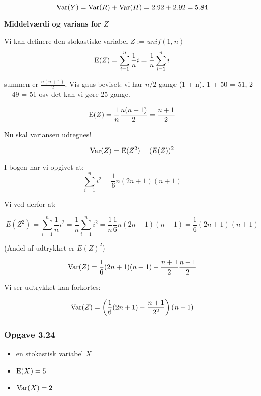 \begin{equation}
    \text{Var}(Y) = \text{Var}(R) + \text{Var}(H) = 2.92 + 2.92 = 5.84
\end{equation}

\textbf{Middelværdi og varians for $Z$}

Vi kan definere den stokastiske variabel $Z := unif(1,n)$
\begin{equation}
    \text{E}(Z) = \sum_{i=1}^n \frac{1}{n}i = \frac{1}{n}\sum_{i=1}^n i
\end{equation}

summen er $\frac{n(n+1)}{2}$. Vis gaus beviset: vi har $n/2$ gange (1 + n). 1 + 50 = 51, 2 + 49 = 51 osv det kan vi gøre 25 gange.

\begin{equation}
    \text{E}(Z) = \frac{1}{n} \frac{n(n+1)}{2} = \frac{n+1}{2}
\end{equation}

Nu skal variansen udregnes!

\begin{equation}
    \text{Var}(Z) = \text{E}(Z^2) - (E(Z))^2
\end{equation}

I bogen har vi opgivet at:
\begin{equation}
    \sum_{i=1}^n i^2 = \frac{1}{6} n (2n+1)(n+1)
\end{equation}

Vi ved derfor at:

\begin{equation}
    E(Z^2) = \sum_{i=1}^n \frac{1}{n} i^2 = \frac{1}{n} \sum_{i=1}^n i^2 = \frac{1}{n}\frac{1}{6} n (2n+1)(n+1) = \frac{1}{6} (2n+1)(n+1)
\end{equation}

(Andel af udtrykket er $E(Z)^2$)

\begin{equation}
    \text{Var}(Z) = \frac{1}{6} (2n+1)(n+1) - \frac{n+1}{2}\frac{n+1}{2}
\end{equation}

Vi ser udtrykket kan forkortes:

\begin{equation}
    \text{Var}(Z) = \left(\frac{1}{6} (2n+1) - \frac{n+1}{2^2 }\right)(n+1)
\end{equation}

\subsubsection{Opgave 3.24}

\begin{itemize}
    \item en stokastisk variabel $X$
    \item $\text{E}(X) = 5$
    \item $\text{Var}(X) = 2$
\end{itemize}

